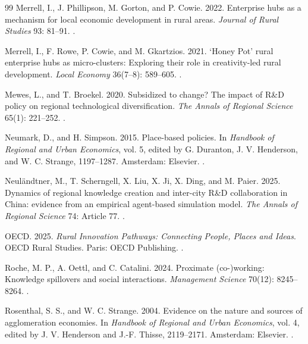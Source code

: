 \begin{thebibliography}{99}
Merrell, I., J. Phillipson, M. Gorton, and P. Cowie. 2022. Enterprise hubs as a mechanism for local economic development in rural areas. \emph{Journal of Rural Studies} 93: 81--91. .

Merrell, I., F. Rowe, P. Cowie, and M. Gkartzios. 2021. `Honey Pot' rural enterprise hubs as micro-clusters: Exploring their role in creativity-led rural development. \emph{Local Economy} 36(7--8): 589--605. .

Mewes, L., and T. Broekel. 2020. Subsidized to change? The impact of R\&D policy on regional technological diversification. \emph{The Annals of Regional Science} 65(1): 221--252. .

Neumark, D., and H. Simpson. 2015. Place-based policies. In \emph{Handbook of Regional and Urban Economics}, vol. 5, edited by G. Duranton, J. V. Henderson, and W. C. Strange, 1197--1287. Amsterdam: Elsevier. .

Neul{\"a}ndtner, M., T. Scherngell, X. Liu, X. Ji, X. Ding, and M. Paier. 2025. Dynamics of regional knowledge creation and inter-city R\&D collaboration in China: evidence from an empirical agent-based simulation model. \emph{The Annals of Regional Science} 74: Article 77. .

OECD. 2025. \emph{Rural Innovation Pathways: Connecting People, Places and Ideas}. OECD Rural Studies. Paris: OECD Publishing. .

Roche, M. P., A. Oettl, and C. Catalini. 2024. Proximate (co-)working: Knowledge spillovers and social interactions. \emph{Management Science} 70(12): 8245--8264. .

Rosenthal, S. S., and W. C. Strange. 2004. Evidence on the nature and sources of agglomeration economies. In \emph{Handbook of Regional and Urban Economics}, vol. 4, edited by J. V. Henderson and J.-F. Thisse, 2119--2171. Amsterdam: Elsevier. .


\end{thebibliography}
